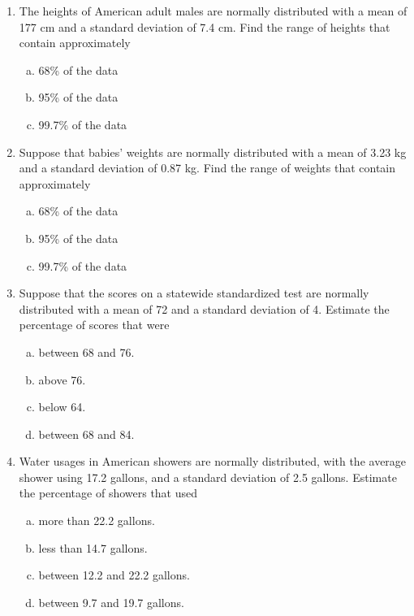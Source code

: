 \begin{enumerate}
\item The heights of American adult males are normally distributed with a mean of 177 cm and a standard deviation of 7.4 cm.  Find the range of heights that contain approximately
\begin{enumerate}[(a)]
\item 68\% of the data 
\item 95\% of the data 
\item 99.7\% of the data 
\end{enumerate}

\item Suppose that babies' weights are normally distributed with a mean of 3.23 kg and a standard deviation of 0.87 kg.  Find the range of weights that contain approximately
\begin{enumerate}[(a)]
\item 68\% of the data 
\item 95\% of the data 
\item 99.7\% of the data 
\end{enumerate}

\item Suppose that the scores on a statewide standardized test are normally distributed with a mean of 72 and a standard deviation of 4.  Estimate the percentage of scores that were
\begin{enumerate}[(a)]
\item between 68 and 76. 
\item above 76. 
\item below 64. 
\item between 68 and 84. 
\end{enumerate}

\item Water usages in American showers are normally distributed, with the average shower using 17.2 gallons, and a standard deviation of 2.5 gallons.  Estimate the percentage of showers that used
\begin{enumerate}[(a)]
\item more than 22.2 gallons. 
\item less than 14.7 gallons. 
\item between 12.2 and 22.2 gallons. 
\item between 9.7 and 19.7 gallons. 
\end{enumerate}


\end{enumerate}
